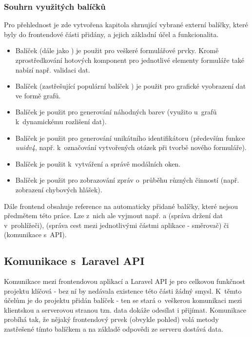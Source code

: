 		\subsubsection{Souhrn využitých balíčků}\label{sec:fe_packages}
		Pro přehlednost je zde vytvořena kapitola shrnující vybrané externí balíčky, které byly do frontendové části přidány, a jejich základní účel a funkcionalita.
		
		\begin{itemize}
			\item Balíček  (dále jako ) je použit pro veškeré formulářové prvky. Kromě zprostředkování hotových komponent pro jednotlivé elementy formuláře také nabízí např. validaci dat.
			\item Balíček  (zastřešující populární balíček ) je použit pro grafické vyobrazení dat ve formě grafů.
			\item Balíček  je použit pro generování náhodných barev (využito u~grafů k~dynamickému rozlišení dat).
			\item Balíček  je použit pro generování unikátního identifikátoru (především funkce \textit{uuidv4}, např. k~označování vytvořených otázek při tvorbě nového formuláře).
			\item Balíček  je použit k~vytváření a správě modálních oken.
			\item Balíček  je použit pro zobrazování zpráv o~průběhu různých činností (např. zobrazení chybových hlášek).
		\end{itemize}
	
		Dále frontend obsahuje reference na automaticky přidané balíčky, které nejsou předmětem této práce. Lze z~nich ale vyjmout např.  a  (správa držení dat v~prohlížeči),  (správa cest mezi jednotlivými částmi aplikace - směrovač) či  (komunikace s~API).
	
	\subsection{Komunikace s~Laravel API}\label{sec:komunikace_s_api}
	Komunikace mezi frontendovou aplikací a Laravel API je pro celkovou funkčnost projektu klíčová - bez ní by nedávala existence této části žádný smysl. K~těmto účelům je do projektu přidán balíček  - ten se stará o~veškerou komunikaci mezi klientskou a serverovou stranou tzn. data dokáže odesílat i přijímat. Komunikace probíhá tak, že nějaký frontendový prvek (obvykle pohled) volá metody zastřešené tímto balíčkem a na základě odpovědi ze serveru dostává data.
	
